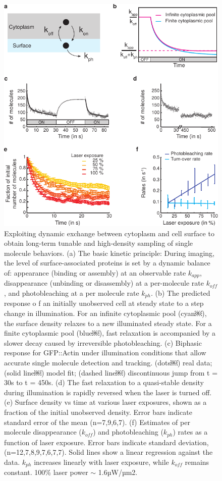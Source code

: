  \begin{figure}[h!]
 	\centering
 	\includegraphics[width=0.6\hsize]{nmeth/Fig2}
 	\caption{\label{fig:fig2} Exploiting dynamic exchange between cytoplasm and cell surface to obtain long-term tunable and high-density sampling of single molecule behaviors. (a) The basic kinetic principle: During imaging, the level of surface-associated proteins is set by a dynamic balance of: appearance (binding or assembly) at an observable rate $k_{app}$, disappearance (unbinding or disassembly) at a per-molecule rate $k_{off}$, and photobleaching at a per molecule rate $k_{ph}$. (b) The predicted response o f an initially unobserved cell at steady state to a step change in illumination. For an infinite cytoplasmic pool (cyan￼), the surface density relaxes to a new illuminated steady state. For a finite cytoplasmic pool (blue￼), fast relaxation is accompanied by a slower decay caused by irreversible photobleaching. (c) Biphasic response for GFP::Actin under illumination conditions that allow accurate single molecule detection and tracking. (dots￼) real data; (solid line￼) model fit; (dashed line￼) discontinuous jump from t = 30s to t = 450s. (d) The fast relaxation to a quasi-stable density during illumination is rapidly reversed when the laser is turned off. (e) Surface density vs time at various laser exposures, shown as a fraction of the initial unobserved density. Error bars indicate standard error of the mean (n=7,9,6,7). (f) Estimates of per molecule disappearance ($k_{off}$) and photobleaching ($k_{ph}$) rates as a function of laser exposure. Error bars indicate standard deviation, (n=12,7,8,9,7,6,7,7). Solid lines show a linear regression against the data. $k_{ph}$ increases linearly with laser exposure, while $k_{off}$ remains constant. 100\% laser power $\sim$ 1.6µW/µm2.}
 \end{figure}
 
